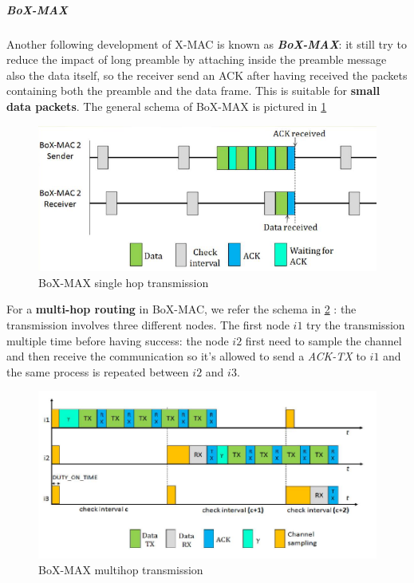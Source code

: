 \documentclass[10pt,a4paper]{report}
\theoremstyle{definition}
\begin{document}
\subparagraph{BoX-MAX}
Another following development of X-MAC is known as \textit{\textbf{BoX-MAX}}: it still try to reduce the impact of long preamble by attaching inside the preamble message also the data itself, so the receiver send an ACK after having received the packets containing both the preamble and the data frame. This is suitable for \textbf{small data packets}. The general schema of BoX-MAX is pictured in \ref{box-max}
\begin{figure}[h]
	\centering\includegraphics[scale=0.50]{images/Pasted image 20230409091352.png}
	\caption{BoX-MAX single hop transmission}
\label{box-max}
\end{figure}


For a \textbf{multi-hop routing} in BoX-MAC, we refer the schema in \ref{boxmax-multihop} : the transmission involves three different nodes. The first node $i1$ try the transmission multiple time before having success: the node $i2$ first need to sample the channel and then receive the communication so it's allowed to send a \textit{ACK-TX} to $i1$ and the same process is repeated between $i2$ and $i3$.

\begin{figure}[h!]
	\centering\includegraphics[scale=0.40]{images/Pasted image 20230409091501.png}
	\caption{BoX-MAX multihop transmission}
	\label{boxmax-multihop}
\end{figure}
\end{document}
